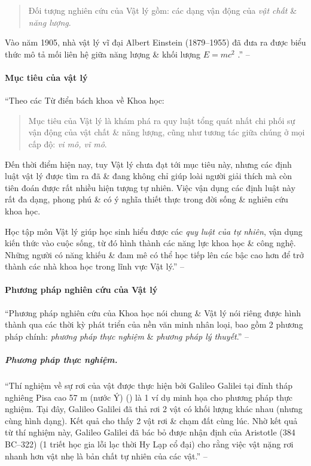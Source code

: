 \documentclass{article}
\numberwithin{equation}{section}
\begin{document}
\begin{quotation}
	Đối tượng nghiên cứu của Vật lý gồm: các dạng vận động của \textit{vật chất} \& \textit{năng lượng}.
\end{quotation}
Vào năm 1905, nhà vật lý vĩ đại Albert Einstein (1879--1955) đã đưa ra được biểu thức mô tả mối liên hệ giữa năng lượng \& khối lượng $E = mc^2$ \cite[Hình 1.1, p. 5]{SGK_Vat_Ly_10_Chan_Troi_Sang_Tao}.'' -- \cite[p. 5]{SGK_Vat_Ly_10_Chan_Troi_Sang_Tao}

\paragraph{Mục tiêu của vật lý}
``Theo các Từ điển bách khoa về Khoa học:

\begin{quotation}
	Mục tiêu của Vật lý là khám phá ra quy luật tổng quát nhất chi phối sự vận động của vật chất \& năng lượng, cũng như tương tác giữa chúng ở mọi cấp độ: \textit{vi mô, vĩ mô}.
\end{quotation}
Đến thời điểm hiện nay, tuy Vật lý chưa đạt tới mục tiêu này, nhưng các định luật vật lý được tìm ra đã \& đang không chỉ giúp loài người giải thích mà còn tiên đoán được rất nhiều hiện tượng tự nhiên. Việc vận dụng các định luật này rất đa dạng, phong phú \& có ý nghĩa thiết thực trong đời sống \& nghiên cứu khoa học.

Học tập môn Vật lý giúp học sinh hiểu được các \textit{quy luật của tự nhiên}, vận dụng kiến thức vào cuộc sống, từ đó hình thành các năng lực khoa học \& công nghệ. Những người có năng khiếu \& đam mê có thể học tiếp lên các bậc cao hơn để trở thành các nhà khoa học trong lĩnh vực Vật lý.'' -- \cite[p. 6]{SGK_Vat_Ly_10_Chan_Troi_Sang_Tao}

\paragraph{Phương pháp nghiên cứu của Vật lý}
``Phương pháp nghiên cứu của Khoa học nói chung \& Vật lý nói riêng được hình thành qua các thời kỳ phát triển của nền văn minh nhân loại, bao gồm 2 phương pháp chính: \textit{phương pháp thực nghiệm} \& \textit{phương pháp lý thuyết}.'' -- \cite[p. 6]{SGK_Vat_Ly_10_Chan_Troi_Sang_Tao}

\subparagraph{Phương pháp thực nghiệm.} ``Thí nghiệm về sự rơi của vật được thực hiện bởi Galileo Galilei tại đỉnh tháp nghiêng Pisa cao 57 m (nước Ý) (\cite[Hình 1.3: \textsf{Galileo Galilei (1564--1642) \& tháp nghiêng Pisa.}, p. 6]{SGK_Vat_Ly_10_Chan_Troi_Sang_Tao}) là 1 ví dụ minh họa cho phương pháp thực nghiệm. Tại đây, Galileo Galilei đã thả rơi 2 vật có khối lượng khác nhau (nhưng cùng hình dạng). Kết quả cho thấy 2 vật rơi \& chạm đất cùng lúc. Nhờ kết quả từ thí nghiệm này, Galileo Galilei đã bác bỏ được nhận định của Aristotle (384 BC--322) (1 triết học gia lỗi lạc thời Hy Lạp cổ đại) cho rằng việc vật nặng rơi nhanh hơn vật nhẹ là bản chất tự nhiên của các vật.'' -- \cite[pp. 6--7]{SGK_Vat_Ly_10_Chan_Troi_Sang_Tao}
\end{document}

